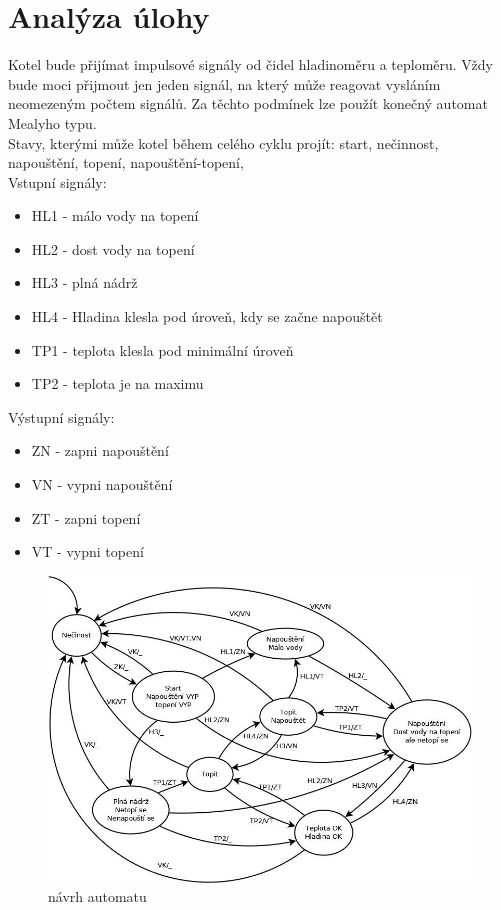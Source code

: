 \documentclass[12pt]{report}
\begin{document}
\chapter{Analýza úlohy}
Kotel bude přijímat impulsové signály od čidel hladinoměru a teploměru. Vždy bude moci přijmout jen jeden signál, na který může reagovat vysláním neomezeným počtem signálů.
Za těchto podmínek lze použít konečný automat Mealyho typu.\\
Stavy, kterými může kotel během celého cyklu projít: start, nečinnost, napouštění, topení, napouštění-topení,\\

Vstupní signály: 
\begin{itemize}
\item HL1 - málo vody na topení
\item HL2 - dost vody na topení
\item HL3 - plná nádrž
\item HL4 - Hladina klesla pod úroveň, kdy se začne napouštět
\item TP1 - teplota klesla pod minimální úroveň
\item TP2 - teplota je na maximu
\end{itemize}

Výstupní signály: 
\begin{itemize}
\item ZN - zapni napouštění
\item VN - vypni napouštění
\item ZT - zapni topení
\item VT - vypni topení
\end{itemize}

\begin{figure}[htbp]
  \centering
  \includegraphics[width=6in]{./images/graf.png}
  \caption{návrh automatu}
\end{figure}
\end{document}
